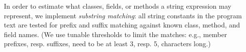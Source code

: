 






In order to estimate what classes, fields, or methods a string
expression may represent, we implement \emph{substring matching}: all
string constants in the program text are tested for prefix and suffix
matching against known class, method, and field names. (We use
tunable thresholds to limit the matches: e.g., member prefixes,
resp. suffixes, need to be at least 3, resp. 5, characters long.)

